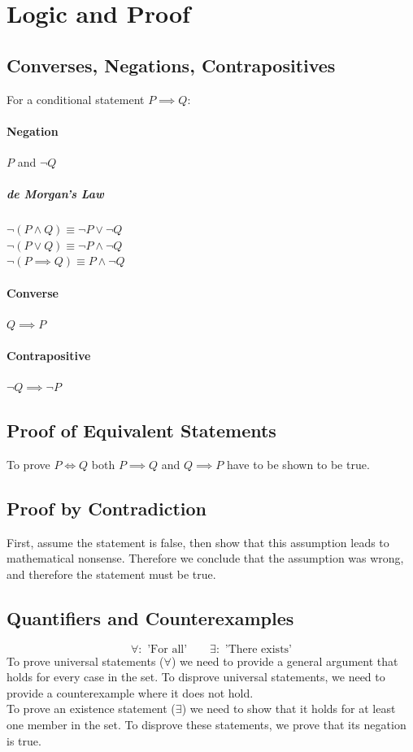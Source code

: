 \documentclass[a4paper,twoside,10pt]{article}
\begin{document}
	\section{Logic and Proof}
		\subsection{Converses, Negations, Contrapositives}
			For a conditional statement $P\implies Q$:
			\paragraph{Negation} $P$ and $\neg Q$
				\subparagraph{de Morgan's Law} $\neg(P\land Q)\equiv\neg P\lor\neg Q$\\
				$\neg(P\lor Q)\equiv\neg P\land\neg Q$\\
				$\neg(P\implies Q)\equiv P\land \neg Q$
			\paragraph{Converse} $Q\implies P$
			\paragraph{Contrapositive} $\neg Q\implies\neg P$
		\subsection{Proof of Equivalent Statements}
			To prove $P\iff Q$ both $P\implies Q$ and $Q\implies P$ have to be shown to be true.
		\subsection{Proof by Contradiction}
			First, assume the statement is false, then show that this assumption leads to mathematical nonsense. Therefore we conclude that the assumption was wrong, and therefore the statement must be true.
		\subsection{Quantifiers and Counterexamples}
			\[
				\forall:\text{ 'For all'} \qquad \exists:\text{ 'There exists'}
			\]
			To prove universal statements ($\forall$) we need to provide a general argument that holds for every case in the set. To disprove universal statements, we need to provide a counterexample where it does not hold.\\
			To prove an existence statement ($\exists$) we need to show that it holds for at least one member in the set. To disprove these statements, we prove that its negation is true.
\end{document}
